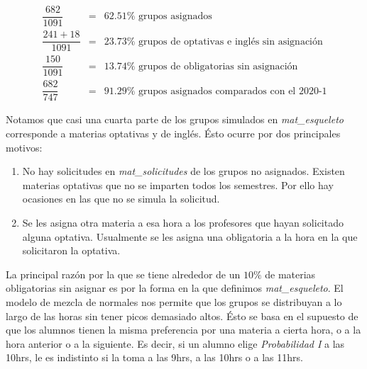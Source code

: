 \begin{eqnarray*}
\dfrac{682}{1091} &=& 62.51\% \text{ grupos asignados}\\
\dfrac{241 + 18}{1091} &=& 23.73\% \text{ grupos de optativas e inglés sin asignación}\\
\dfrac{150}{1091} &=& 13.74\% \text{ grupos de obligatorias sin asignación}\\ %
\dfrac{682}{747} &=& 91.29\% \text{ grupos asignados comparados con el 2020-1}
\end{eqnarray*}


Notamos que casi una cuarta parte de los grupos simulados en \textit{mat\_esqueleto} corresponde a materias optativas y de inglés. Ésto ocurre por dos principales motivos:

\begin{enumerate}
\item No hay solicitudes en \textit{mat\_solicitudes} de los grupos no asignados. Existen materias optativas que no se imparten todos los semestres. Por ello hay ocasiones en las que no se simula la solicitud.

\item Se les asigna otra materia a esa hora a los profesores que hayan solicitado alguna optativa. Usualmente se les asigna una obligatoria a la hora en la que solicitaron la optativa.
\end{enumerate}

La principal razón por la que se tiene alrededor de un $10\%$ de materias obligatorias sin asignar es por la forma en la que definimos \textit{mat\_esqueleto}. El modelo de mezcla de normales nos permite que los grupos se distribuyan a lo largo de las horas sin tener picos demasiado altos. Ésto se basa en el supuesto de que los alumnos tienen la misma preferencia por una materia a cierta hora, o a la hora anterior o a la siguiente. Es decir, si un alumno elige \textit{Probabilidad I} a las 10hrs, le es indistinto si la toma a las 9hrs, a las 10hrs o a las 11hrs.

